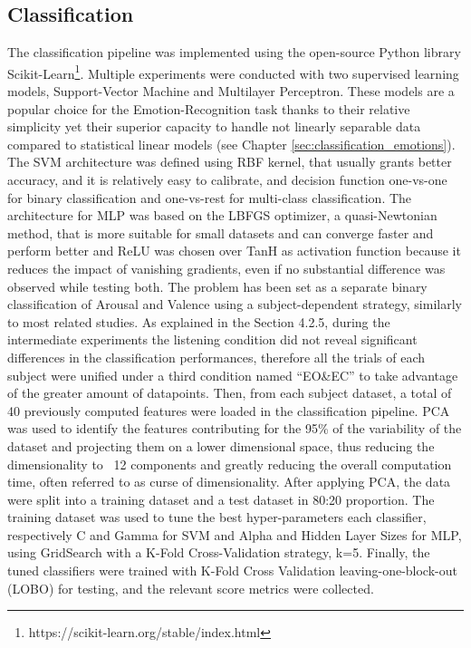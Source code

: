 \subsection{Classification}
\label{sec:classification}
The classification pipeline was implemented using the open-source Python library Scikit-Learn\footnote{https://scikit-learn.org/stable/index.html}. Multiple experiments were conducted with two supervised learning models, Support-Vector Machine and Multilayer Perceptron. These models are a popular choice for the Emotion-Recognition task thanks to their relative simplicity yet their superior capacity to handle not linearly separable data compared to statistical linear models (see Chapter \ref{sec:classification_emotions}). The SVM architecture was defined using RBF kernel, that usually grants better accuracy, and it is relatively easy to calibrate, and decision function one-vs-one for binary classification and one-vs-rest for multi-class classification. The architecture for MLP was based on the LBFGS optimizer, a quasi-Newtonian method, that is more suitable for small datasets and can converge faster and perform better and ReLU was chosen over TanH as activation function because it reduces the impact of vanishing gradients, even if no substantial difference was observed while testing both. The problem has been set as a separate binary classification of Arousal and Valence using a subject-dependent strategy, similarly to most related studies. As explained in the Section 4.2.5, during the intermediate experiments the listening condition did not reveal significant differences in the classification performances, therefore all the trials of each subject were unified under a third condition named “EO\&EC” to take advantage of the greater amount of datapoints. Then, from each subject dataset, a total of 40 previously computed features were loaded in the classification pipeline. PCA was used to identify the features contributing for the 95\% of the variability of the dataset and projecting them on a lower dimensional space, thus reducing the dimensionality to ~12 components and greatly reducing the overall computation time, often referred to as curse of dimensionality. After applying PCA, the data were split into a training dataset and a test dataset in 80:20 proportion. The training dataset was used to tune the best hyper-parameters each classifier, respectively C and Gamma for SVM and Alpha and Hidden Layer Sizes for MLP, using GridSearch with a K-Fold Cross-Validation strategy, k=5. Finally, the tuned classifiers were trained with K-Fold Cross Validation leaving-one-block-out (LOBO) for testing, and the relevant score metrics were collected.
